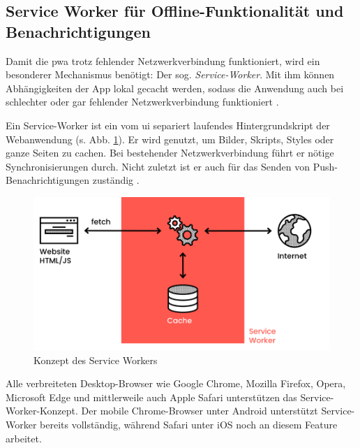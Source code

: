 \subsection{Service Worker für Offline-Funktionalität und Benachrichtigungen}
\label{sub:service_worker}

Damit die \ac{pwa} trotz fehlender Netzwerkverbindung funktioniert, wird ein besonderer Mechanismus benötigt: Der sog. \textit{Service-Worker}. Mit ihm können Abhängigkeiten der App lokal gecacht werden, sodass die Anwendung auch bei schlechter oder gar fehlender Netzwerkverbindung funktioniert \cite[S. 7]{BeginningPWA}.

Ein Service-Worker ist ein vom \ac{ui} separiert laufendes Hintergrundskript der Webanwendung (s. Abb. \ref{fig:serviceWorker}). Er wird genutzt, um Bilder, Skripts, Styles oder ganze Seiten zu cachen. Bei bestehender Netzwerkverbindung führt er nötige Synchronisierungen durch. Nicht zuletzt ist er auch für das Senden von Push-Benachrichtigungen zuständig \cite[S. 24]{BeginningPWA}.
%
\begin{figure}[h!]
        \includegraphics[width=\linewidth]{img/fig/2-4-2_Service_Worker_Concept.png}
        \centering
        \caption{Konzept des Service Workers \cite{ServiceWorkerDiagramm}}
        \label{fig:serviceWorker}
\end{figure}
%

Alle verbreiteten Desktop-Browser wie Google Chrome, Mozilla Firefox, Opera, Microsoft Edge und mittlerweile auch Apple Safari unterstützen das Service-Worker-Konzept. Der mobile Chrome-Browser unter Android unterstützt Service-Worker bereits vollständig, während Safari unter iOS noch an diesem Feature arbeitet. \cite[S. 9]{BeginningPWA}
%



